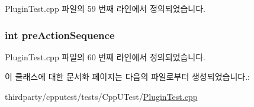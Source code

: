 Plugin\+Test.\+cpp 파일의 59 번째 라인에서 정의되었습니다.

\subsubsection[{\texorpdfstring{pre\+Action\+Sequence}{preActionSequence}}]{\setlength{\rightskip}{0pt plus 5cm}int pre\+Action\+Sequence\hspace{0.3cm}{\ttfamily [inherited]}}\hypertarget{class_dummy_plugin_a187389c828523313bf4cfe7400f445fb}{}\label{class_dummy_plugin_a187389c828523313bf4cfe7400f445fb}


Plugin\+Test.\+cpp 파일의 60 번째 라인에서 정의되었습니다.



이 클래스에 대한 문서화 페이지는 다음의 파일로부터 생성되었습니다.\+:\begin{DoxyCompactItemize}
\item 
thirdparty/cpputest/tests/\+Cpp\+U\+Test/\hyperlink{_plugin_test_8cpp}{Plugin\+Test.\+cpp}\end{DoxyCompactItemize}
